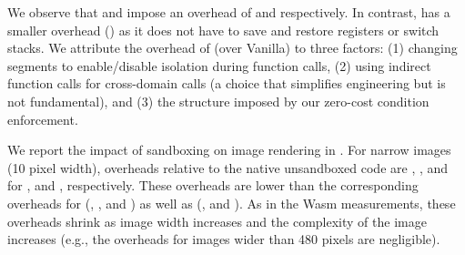\noindent
We observe that \trnacl and \tridealheavy impose an overhead of 
\ffMaxFontOverheadNaClNative and \ffMaxFontOverheadIdealNative 
respectively.
%
In contrast, \trsegmentsfi has a smaller overhead
(\ffMaxFontOverheadSegzeroNative) as it does not have to save and restore
registers or switch stacks.
%
We attribute the overhead of \trsegmentsfi (over Vanilla) to three
factors: (1) changing segments to enable/disable isolation 
during function calls, (2) using indirect function calls for cross-domain calls
(a choice that simplifies engineering but is not fundamental), and (3)
the structure imposed by our zero-cost condition enforcement.

%
We report the impact of sandboxing on image rendering in
.
%
For narrow images (10 pixel width), \trsegmentsfi overheads relative to the
native unsandboxed code are \ffMaxImgSimpleOverheadSegzeroNative, 
\ffMaxImgStockOverheadSegzeroNative, and \ffMaxImgRandomOverheadSegzeroNative 
for \simplejpeg,
\stockjpeg and \randomjpeg, respectively.
%
These overheads are lower than the corresponding overheads for \trnacl
(\ffMaxImgSimpleOverheadNaClNative, 
\ffMaxImgStockOverheadNaClNative, and 
\ffMaxImgRandomOverheadNaClNative) as well as \tridealheavy 
(\ffMaxImgSimpleOverheadIdealNative, 
\ffMaxImgStockOverheadIdealNative and 
\ffMaxImgRandomOverheadIdealNative).
%
As in the Wasm measurements, these overheads shrink as image width increases
and the complexity of the image increases (e.g., the overheads for images wider
than 480 pixels are negligible).

